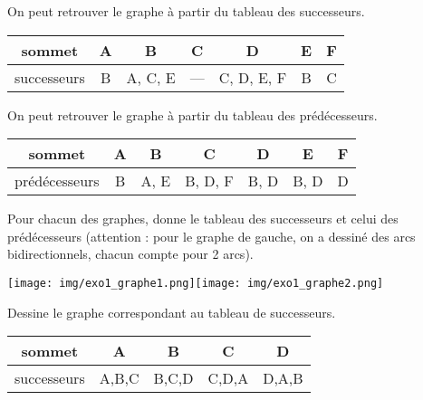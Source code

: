 \documentclass[a4paper,12pt]{book}
\begin{document}
\begin{exemple}[s]

On peut retrouver le graphe à partir du tableau des successeurs.

\begin{center}
\begin{tabular}{|c|c|c|c|c|c|c|}
\hline
sommet & A & B & C & D & E & F \\
\hline
successeurs & B & A, C, E & --- & C, D, E, F & B & C \\
\hline
\end{tabular}
\end{center}

On peut retrouver le graphe à partir du tableau des prédécesseurs.

\begin{center}
\begin{tabular}[color=white]{|c|c|c|c|c|c|c|}
\hline
sommet & A & B & C & D & E & F \\
\hline
prédécesseurs & B & A, E & B, D, F & B, D & B, D & D \\
\hline
\end{tabular}
\end{center}
\end{exemple}

\begin{exercice}[]
Pour chacun des graphes, donne le tableau des successeurs et celui des prédécesseurs (attention : pour le graphe de gauche, on a dessiné des arcs bidirectionnels, chacun compte pour 2 arcs).
\begin{center}
\texttt{[image: img/exo1\_graphe1.png]}\hspace*{2cm}\texttt{[image: img/exo1\_graphe2.png]}
\end{center}
\end{exercice}


\begin{exercice}[]
Dessine le graphe correspondant au tableau de successeurs.
\begin{center}
\begin{tabular}{|c|c|c|c|c|}
\hline
sommet 		& A		 & B 		& C		 & D \\
\hline
successeurs & A,B,C 	& B,C,D 	& C,D,A 		& D,A,B\\
\hline
\end{tabular}
\end{center}
\end{exercice}
\end{document}
